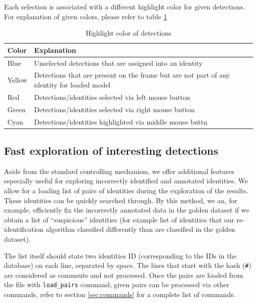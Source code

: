 Each selection is associated with a different highlight color for given detections.
For explanation of given colors, please refer to table \ref{tab:annotation_highlight}

\begin{table}[]
    \centering
    \begin{tabularx}{\textwidth}{l|X}
         \textbf{Color} & \textbf{Explanation} \\ \hline
         Blue & Unselected detections that are assigned into an identity \\ \hline
         Yellow & Detections that are present on the frame but are not part of any
         identity for loaded model \\ \hline
         Red & Detections/identities selected via left mouse button \\ \hline
         Green & Detections/identities selected via right mouse button \\ \hline
         Cyan & Detections/identities highlighted via middle mouse buttn \\
    \end{tabularx}
    \caption{Highlight color of detections}
    \label{tab:annotation_highlight}
\end{table}

\subsection{Fast exploration of interesting detections}

\label{subsec:exploration}

Aside from the standard controlling mechanism, we offer additional features especially
useful for exploring incorrectly identified and annotated identities. We allow
for a loading list of pairs of identities during the exploration of the results. These
identities can be quickly searched through. By this method, we an, for example, efficiently fix the incorrectly annotated data in the golden dataset if we obtain a list of ``suspicious'' identities (for example list of identities that our re-identification algorithm classified differently than are classified in the golden dataset).

The list itself should state two identities ID (corresponding to the IDs in the
database) on each line, separated by space. The lines that start with the hash (\verb+#+) are considered as comments and not processed. Once the pairs are loaded
from the file with \verb+load_pairs+ command, given pairs can be processed via other
commands, refer to section \ref{sec:commands} for a complete list of commands.

